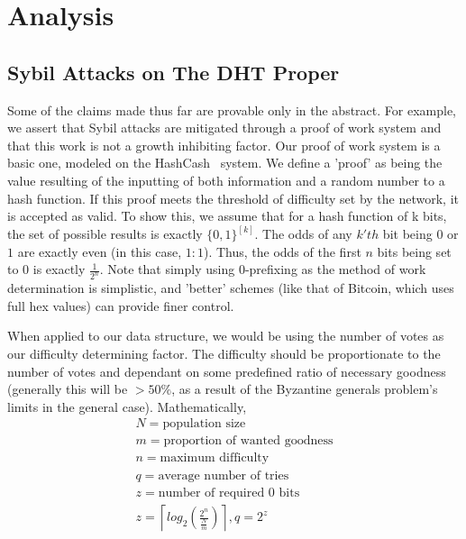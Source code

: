 \documentclass[10pt]{IEEEtran}
\providecommand{\myceil}[1]{\left \lceil #1 \right \rceil }
\begin{document}
\section{Analysis}
\subsection{Sybil Attacks on The DHT Proper}
\par Some of the claims made thus far are provable only in the abstract. For example, we assert that Sybil attacks are mitigated through a proof of work system and that this work is not a growth inhibiting factor. Our proof of work system is a basic one, modeled on the HashCash~\cite{Back:2002vq} system. We define a 'proof' as being the value resulting of the inputting of both information and a random number to a hash function. If this proof meets the threshold of difficulty set by the network, it is accepted as valid. To show this, we assume that for a hash function of k bits, the set of possible results is exactly $\{0,1\}^{[k]}$. The odds of any $k'th$ bit being $0$ or $1$ are exactly even (in this case, $1:1$). Thus, the odds of the first $n$ bits being set to 0 is exactly $\frac{1}{2^n}$. Note that simply using $0$-prefixing as the method of work determination is simplistic, and 'better' schemes (like that of Bitcoin, which uses full hex values) can provide finer control. 

\par When applied to our data structure, we would be using the number of votes as our difficulty determining factor. The difficulty should be proportionate to the number of votes and dependant on some predefined ratio of necessary goodness (generally this will be $ > 50\%$, as a result of the Byzantine generals problem's limits in the general case). Mathematically,
\begin{multline}
N = \textrm{population size} \\
m = \textrm{proportion of wanted goodness} \\
n = \textrm{maximum difficulty} \\
q = \textrm{average number of tries} \\
z = \textrm{number of required 0 bits} \\
z = \myceil{log_2{ (\frac{2^n}{\frac{N}{m}})}}, q = 2^z \\
\end{multline}
\end{document}
